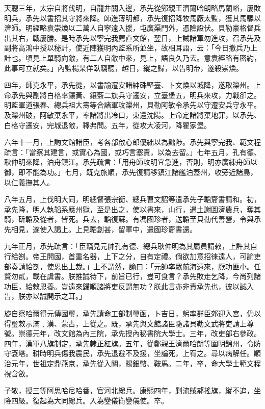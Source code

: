 \begin{pinyinscope}
天聰三年，太宗自將伐明，自龍井關入邊，承先從鄭親王濟爾哈朗略馬蘭峪，屢敗明兵，承先以書招其守將來降。師進薄明都，承先復招降牧馬廠太監，獲其馬騾以濟師。明經略袁崇煥以二萬人自寧遠入援，屯廣渠門外，憑險設伏。貝勒豪格督兵出其右，戰屢勝。是時承先以寧完我薦直文館，翌日，上誡諸軍勿進攻，召承先及副將高鴻中授以秘計，使近陣獲明內監系所並坐，故相耳語，云：「今日撤兵乃上計也。頃見上單騎向敵，有二人自敵中來，見上，語良久乃去。意袁經略有密約，此事可立就矣。」內監楊某佯臥竊聽，越日，縱之歸，以告明帝，遂殺崇煥。

四年，師克永平，承先從，以書諭遷安諸紳硃堅臺、卜文煥以城降，遂取灤州。上命承先與副將白格率鑲黃、鑲藍二旗兵守遷安，立臺堡五，明兵來攻，力戰卻之。明監軍道張春、總兵祖大壽等合諸軍攻灤州，貝勒阿敏令承先以守遷安兵守永平。及灤州破，阿敏棄永平，率諸將出冷口，東還沈陽。上命定諸將棄地罪，以承先、白格守遷安，完城退敵，釋弗問。五年，從攻大凌河，降翟家堡。

六年十一月，上詢文館諸臣，考各部啟心郎優絀以為黜陟。承先與寧完我、範文程疏言：「當察其建言，或實心為國，或巧言塞責，以為去留。」七年五月，孔有德、耿仲明來降，泊舟鎮江。承先疏言：「用舟師攻明宜急進，否則，明亦廣練舟師以御，即不能為功。」七月，既克旅順，承先復請移鎮江諸艦泊蓋州，收旁近諸島，以仁義撫其人。

八年五月，上伐明大同，明總督張宗衡、總兵曹文詔等遣承先子韜齎書請和。初，承先降，明人執韜系應州獄，至是出之，使以書來，山行，遇土謝圖濟農兵，奪其騎，斫韜及從者，皆死。兵去，韜復蘇。有馮國珍者，送韜至貝勒代善營，令與承先相見，遂使入謁上。上見韜創甚，留軍中，遣國珍齎書還。

九年正月，承先疏言：「臣竊見元帥孔有德、總兵耿仲明為其屬員請敕，上許其自行給劄。帝王開國，首重名器，上下之分，自有定禮。倘欲加意招徠遠人，可諭吏部奏請給劄，使恩出上裁。」上不謂然，諭曰：「元帥率眾航海遠來，厥功匪小。任賢勿貳，載在虞書。朕推誠待下，前旨已行，豈可食言？承先敗走乞降，今尚列諸功臣，給敕恩養。豈遠來歸順諸將吏反謂無功？朕此言亦非責承先也，彼以誠入告，朕亦以誠開示之耳。」

旋自察哈爾得元傳國璽，承先請命工部制璽函，卜吉日，躬率群臣郊迎入宮，仍以得璽敕示滿﹑漢、蒙古，上從之。既，承先與文館諸臣隨諸貝勒文武將吏請上尊號。崇德元年，改文館為內三院，承先授內秘書院大學士。三年，改吏部右參政。四年，漢軍八旗制定，承先隸正紅旗。五年，從鄭親王濟爾哈朗等圍明錦州，令防守袞塔。耕時明兵傷我農民，承先退避不及援，坐論死，上宥之。尋以病解任。順治元年，世祖定鼎燕京，承先從入關，賜銀幣、鞍馬。二年，卒，命大學士範文程視含斂。

子敬，授三等阿思哈尼哈番，官河北總兵。康熙四年，剿流賊郝搖旗，縱不追，坐降四級。復起為大同總兵。入為鑾儀衛鑾儀使。卒。


\end{pinyinscope}
